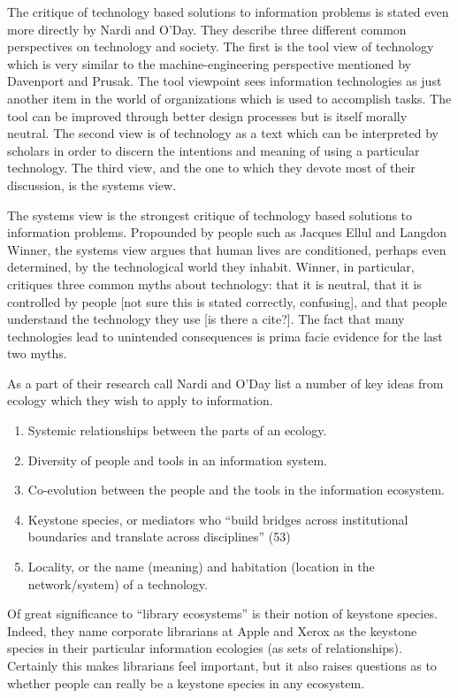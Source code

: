 The critique of technology based solutions to information problems is stated even more directly by Nardi and O'Day. They describe three different common perspectives on technology and society. The first is the tool view of technology which is very similar to the machine-engineering perspective mentioned by Davenport and Prusak. The tool viewpoint sees information technologies as just another item in the world of organizations which is used to accomplish tasks. The tool can be improved through better design processes but is itself morally neutral. The second view is of technology as a text which can be interpreted by scholars in order to discern the intentions and meaning of using a particular technology. The third view, and the one to which they devote most of their discussion, is the systems view.

The systems view is the strongest critique of technology based solutions to information problems. Propounded by people such as Jacques Ellul and Langdon Winner, the systems view argues that human lives are conditioned, perhaps even determined, by the technological world they inhabit. Winner, in particular, critiques three common myths about technology: that it is neutral, that it is controlled by people [not sure this is stated correctly, confusing], and that people understand the technology they use [is there a cite?]. The fact that many technologies lead to unintended consequences is prima facie evidence for the last two myths.

As a part of their research call Nardi and O'Day list a number of key ideas from ecology which they wish to apply to information.

\begin{enumerate}
\item Systemic relationships between the parts of an ecology.
\item Diversity of people and tools in an information system.
\item Co-evolution between the people and the tools in the information ecosystem.
\item Keystone species, or mediators who ``build bridges across institutional boundaries and translate across disciplines'' (53)
\item Locality, or the name (meaning) and habitation (location in the network/system) of a technology.
\end{enumerate}

Of great significance to ``library ecosystems'' is their notion of keystone species. Indeed, they name corporate librarians at Apple and Xerox as the keystone species in their particular information ecologies (as sets of relationships). Certainly this makes librarians feel important, but it also raises questions as to whether people can really be a keystone species in any ecosystem.

